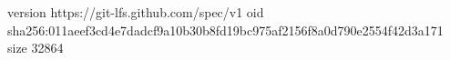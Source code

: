 version https://git-lfs.github.com/spec/v1
oid sha256:011aeef3cd4e7dadcf9a10b30b8fd19bc975af2156f8a0d790e2554f42d3a171
size 32864
